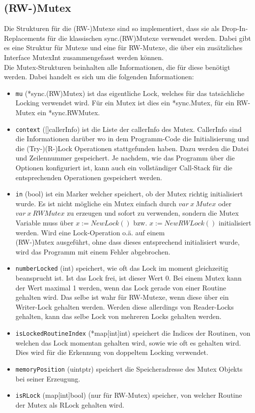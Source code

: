 \subsection{(RW-)Mutex}
Die Strukturen für die (RW-)Mutexe sind so implementiert, dass sie als 
Drop-In-Replacements für die klassischen sync.(RW)Mutexe verwendet werden.
Dabei gibt es eine Struktur für Mutexe und eine für RW-Mutexe, die über ein 
zusätzliches Interface MutexInt zusammengefasst werden können.\\
Die Mutex-Strukturen beinhalten alle Informationen, die für diese benötigt werden.
Dabei handelt es sich um die folgenden Informationen:
\begin{itemize}[leftmargin=1.3em]
  \item \texttt{mu} (*sync.(RW)Mutex) ist das eigentliche Lock, welches für das tatsächliche Locking 
      verwendet wird. Für ein Mutex ist dies ein *sync.Mutex, für ein RW-Mutex
      ein *sync.RWMutex.
  \item \texttt{context} ([]callerInfo) ist die Liste der callerInfo des Mutex.
    CallerInfo sind die Informationen darüber wo in dem Programm-Code die 
    Initialisierung und die (Try-)(R-)Lock Operationen stattgefunden haben. 
    Dazu werden die Datei und Zeilennummer gespeichert. Je nachdem, wie das 
    Programm über die Optionen konfiguriert ist, kann auch ein vollständiger 
    Call-Stack für die entsprechenden Operationen gespeichert werden. 
  \item \texttt{in} (bool) ist ein Marker welcher speichert, ob der Mutex richtig 
      initialisiert wurde. Es ist nicht mögliche ein Mutex einfach durch 
      $var\ x\ Mutex$ oder $var\ x\ RWMutex$ zu erzeugen und sofort zu verwenden, 
      sondern die Mutex Variable muss über $x := NewLock()$ bzw. 
      $x := NewRWLock()$ initialisiert werden. Wird eine Lock-Operation o.ä. 
      auf einem\\(RW-)Mutex ausgeführt, ohne dass dieses entsprechend initialisiert
      wurde, wird das Programm mit einem Fehler abgebrochen.
  \item \texttt{numberLocked} (int) speichert, wie oft das Lock im 
      moment gleichzeitig beansprucht ist. Ist das Lock frei, ist dieser Wert $0$.
      Bei einem Mutex kann der Wert maximal 1 werden, wenn das Lock gerade von 
      einer Routine gehalten wird. Das selbe ist wahr für RW-Mutexe, wenn diese 
      über ein Writer-Lock gehalten werden. Werden diese allerdings von 
      Reader-Locks gehalten, kann das selbe Lock von mehreren Locks gehalten 
      werden.
  \item \texttt{isLockedRoutineIndex} (*map[int]int) speichert die Indices der Routinen, von 
    welchen das Lock momentan gehalten wird, sowie wie oft es gehalten wird. 
    Dies wird für die Erkennung von doppeltem Locking verwendet.
  \item \texttt{memoryPosition} (uintptr) speichert die Speicheradresse des 
    Mutex Objekts bei seiner Erzeugung.
  \item \texttt{isRLock} (map[int]bool) (nur für RW-Mutex) speicher, von welcher Routine 
    der Mutex als RLock gehalten wird.
\end{itemize}
